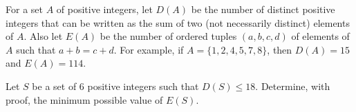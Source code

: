 For a set $A$ of positive integers, let $D(A)$ be the number of distinct positive integers that can be written as the sum of two (not necessarily distinct) elements of $A$. Also let $E(A)$ be the number of ordered tuples $(a,b,c,d)$ of elements of $A$ such that $a+b=c+d$. For example, if $A=\{1,2,4,5,7,8\}$, then $D(A)=15$ and $E(A)=114$.

Let $S$ be a set of $6$ positive integers such that $D(S)\leq18$. Determine, with proof, the minimum possible value of $E(S)$.
